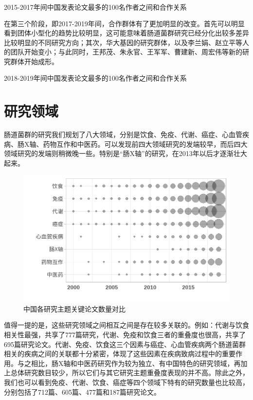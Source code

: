 \documentclass[]{ctexbook}
\begin{document}
\hypertarget{htmlwidget-10982a219c404cc59d17}{}

\label{fig:top-china-aut-col-net-2015-2017}2015-2017年间中国发表论文最多的100名作者之间和合作关系

在第三个阶段，即2017-2019年间，合作群体有了更加明显的改变。首先可以明显看到团体小型化的趋势比较明显，这可能意味着肠道菌群研究已经分化出较多差异比较明显的不同研究方向；其次，华大基因的研究群体，以及李兰娟、赵立平等人的团队开始变小；与此同时，王邦茂、朱永官、王军军、曹建新、周宏伟等新的研究群体开始成形。

\hypertarget{htmlwidget-8ffe182811e553df1b98}{}

\label{fig:top-china-aut-col-net-2018-2019}2018-2019年间中国发表论文最多的100名作者之间和合作关系

\hypertarget{ux7814ux7a76ux9886ux57df}{%
\section{研究领域}\label{ux7814ux7a76ux9886ux57df}}

肠道菌群的研究我们规划了八大领域，分别是饮食、免疫、代谢、癌症、心血管疾病、肠X轴、药物互作和中医药。可以发现前四大领域研究的发端较早，而后四大领域研究的发端则稍微晚一些。特别是``肠X轴''的研究，在2013年以后才逐渐壮大起来。

\begin{figure}
\includegraphics[width=1\linewidth]{plots/topic-nRecord-in-china-study-1} \caption{中国各研究主题关键论文数量对比}\label{fig:topic-nRecord-in-china-study}
\end{figure}

值得一提的是，这些研究领域之间相互之间是存在较多关联的。例如：代谢与饮食相关性最强，共享了777篇研究，代谢、免疫和饮食三者的重叠度也很高，共享了695篇研究论文。代谢、免疫、饮食这三个因素与癌症、心血管疾病两个肠道菌群相关的疾病之间的关联都十分紧密，体现了这些因素在疾病致病过程中的重要作用。与之相比，肠X轴和中医药研究作为较为独立、有中国特色的研究领域，再加上总体研究数目较少，所以它们与其它研究主题重叠度表现的并不高。除此之外，我们也可以看到免疫、代谢、饮食、癌症等四个领域下特有的研究数量也比较高，分别包括了712篇、605篇、477篇和187篇研究论文。
\end{document}
